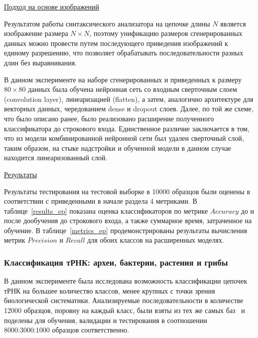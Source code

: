 \documentclass[14pt]{matmex-diploma-custom}
\begin{document}
\vspace{10pt}
\underline{Подход на основе изображений}

Результатом работы синтаксического анализатора на цепочке длины $N$ является изображение размера $N\times N$, поэтому унификацию размеров сгенерированных данных можно провести путем последующего приведения изображений к единому разрешению, что позволяет обрабатывать последовательности разных длин без выравнивания.

В данном эксперименте на наборе сгенерированных и приведенных к размеру $80\times80$ данных была обучена нейронная сеть со входным сверточным слоем (convolution layer), линеаризацией (flatten), а затем, аналогично архитектуре для векторных данных, чередованием dense и dropout слоев. Далее, по той же схеме, что было описано ранее, было реализовано расширение полученного классификатора до строкового входа. Единственное различие заключается в том, что из модели комбинированной нейронной сети был удален сверточный слой, таким образом, на стыке надстройки и обученной модели в данном случае находится линеаризованный слой.

\vspace{10pt}
\underline{Результаты}

Результаты тестирования на тестовой выборке в 10000 образцов были оценены в соответствии с приведенными в начале раздела 4 метриками. В таблице~\ref{results_ep} показана оценка классификаторов по метрике $Accuracy$ до и после дообучения до строкового входа, а также суммарное время, затраченное на обучение. В таблице~\ref{metrics_ep} продемонстрированы результаты вычисления метрик $Precision$ и $Recall$ для обоих классов на расширенных моделях.
\vspace{10pt}




\subsubsection{Классификация тРНК: археи, бактерии, растения и грибы}
В данном эксперименте была исследована возможность классификации цепочек тРНК на большее количество классов, менее крупных с точки зрения биологической систематики. Анализируемые последовательности в количестве 12000 образцов, поровну на каждый класс, были взяты из тех же самых  баз~\cite{trnadb1,trnadb2} и поделены для обучения, валидации и тестирования в соотношении 8000:3000:1000 образцов соответственно.
\end{document}
